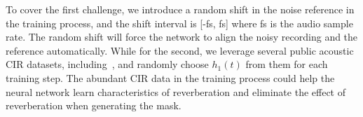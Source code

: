 To cover the first challenge, we introduce a random shift in the noise reference in the training process, and the shift interval is [-fs, fs] where fs is the audio sample rate. The random shift will force the network to align the noisy recording and the reference automatically. While for the second, we leverage several public acoustic CIR datasets, including~\cite{AIR, RWCP, SPARG}, and randomly choose $h_{1}(t)$ from them for each training step. The abundant CIR data in the training process could help the neural network learn characteristics of reverberation and eliminate the effect of reverberation when generating the mask.
